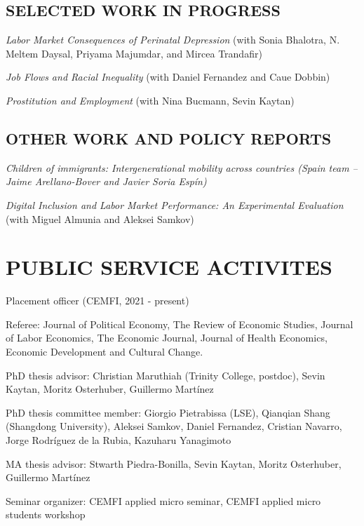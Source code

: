 \documentclass[margin]{res} %
\begin{document}
\begin{resume}
\subsection{SELECTED WORK IN PROGRESS}

\textit{Labor Market Consequences of Perinatal Depression} (with Sonia Bhalotra, N. Meltem Daysal, Priyama Majumdar, and Mircea Trandafir) 

\textit{Job Flows and Racial Inequality} (with Daniel Fernandez and Caue Dobbin) 

\textit{Prostitution and Employment} (with Nina Bucmann, Sevin Kaytan)


\subsection{OTHER WORK AND POLICY REPORTS}

\textit{Children of immigrants: Intergenerational mobility across countries (Spain team -- Jaime Arellano-Bover and Javier Soria Espín)}

\textit{Digital Inclusion and Labor Market Performance: An Experimental Evaluation} (with Miguel Almunia and Aleksei Samkov)

\section{PUBLIC SERVICE ACTIVITES} 

Placement officer (CEMFI, 2021 - present)

Referee: Journal of Political Economy, The Review of Economic Studies, Journal of Labor Economics, The Economic Journal, Journal of Health Economics, Economic Development and Cultural Change.

PhD thesis advisor: Christian Maruthiah (Trinity College, postdoc), Sevin Kaytan, Moritz Osterhuber, Guillermo Martínez

PhD thesis committee member: Giorgio Pietrabissa (LSE), Qianqian Shang (Shangdong University), Aleksei Samkov, Daniel Fernandez, Cristian Navarro, Jorge Rodríguez de la Rubia, Kazuharu Yanagimoto

MA thesis advisor: Stwarth Piedra-Bonilla, Sevin Kaytan, Moritz Osterhuber, Guillermo Martínez

Seminar organizer: CEMFI applied micro seminar, CEMFI applied micro students workshop 


\end{resume}
\end{document}
